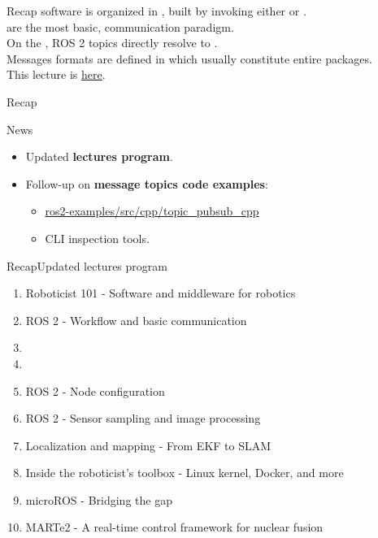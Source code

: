 
\begin{frame}{Recap}
	 software is organized in , built by  invoking either  or .\\
	\bigskip
	 are the most basic,  communication paradigm.\\
	On the , ROS 2 topics directly resolve to .\\
	\bigskip
	Messages formats are defined in  which usually constitute entire packages.\\
	\bigskip
	This lecture is \href{https://github.com/robmasocco/DAFN24_Robotics_3}{\color{blue}\underline{here}}.
\end{frame}
\begin{frame}{Recap}
	\begin{block}{News}
		\begin{itemize}
			\item Updated \textbf{lectures program}.
			\item Follow-up on \textbf{message topics code examples}:
			      \begin{itemize}
				      \item \href{https://github.com/IntelligentSystemsLabUTV/ros2-examples/tree/humble/src/cpp/topic_pubsub_cpp}{\color{blue}\underline{ros2-examples/src/cpp/topic\_pubsub\_cpp}}
				      \item CLI inspection tools.
			      \end{itemize}
		\end{itemize}
	\end{block}
\end{frame}
\begin{frame}{Recap}{Updated lectures program}
	\begin{enumerate}
		\item Roboticist 101 - Software and middleware for robotics
		\item ROS 2 - Workflow and basic communication
		\item {}
		\item {}
		\item ROS 2 - Node configuration
		\item ROS 2 - Sensor sampling and image processing
		\item Localization and mapping - From EKF to SLAM
		\item Inside the roboticist's toolbox - Linux kernel, Docker, and more
		\item microROS - Bridging the gap
		\item MARTe2 - A real-time control framework for nuclear fusion
	\end{enumerate}
\end{frame}
